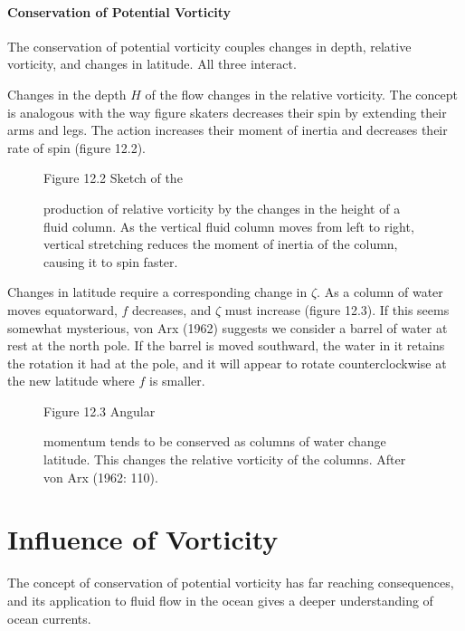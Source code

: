 \paragraph{Conservation of Potential Vorticity}
The conservation of potential vorticity couples
changes in depth, relative vorticity, and changes in latitude. All three interact.
\begin{enumerate}
\vitem Changes in the depth $H$ of the flow changes in the relative
vorticity. The concept is analogous with the way figure skaters decreases their
spin by extending their arms and legs. The action increases their moment of
inertia and decreases their rate of spin (figure 12.2).
\begin{figure}[h!]
\footnotesize
Figure 12.2 Sketch of the \rule{0pt}{4ex}production of relative
vorticity by the changes in the height of a fluid column. As the vertical
fluid column moves from left to right, vertical stretching reduces the moment of
inertia of the column, causing it to spin faster.
\label{fig:spinsketch}
\vspace{-2ex}
\end{figure}
\vitem Changes in latitude require a corresponding change in $\zeta$. As a column
of water moves equatorward, $f$ decreases, and $\zeta$ must increase (figure
12.3). If this seems somewhat mysterious, von Arx (1962) suggests we consider a
barrel of water at rest at the north pole. If the barrel is moved southward, the
water in it retains the rotation it had at the pole, and it will appear to
rotate counterclockwise at the new latitude where $f$ is smaller.
\end{enumerate}
\begin{figure}[b!]
\centering
\footnotesize
Figure 12.3 Angular \rule{0pt}{6ex}momentum tends to be conserved
as columns of water change latitude. This changes the relative vorticity
of the columns. After von Arx (1962: 110).

\label{fig:planetaryvorticity}
\end{figure}

\section{Influence of Vorticity}
The concept
of conservation of potential vorticity has far reaching consequences, and its
application to fluid flow in the ocean gives a deeper understanding of ocean
currents.

